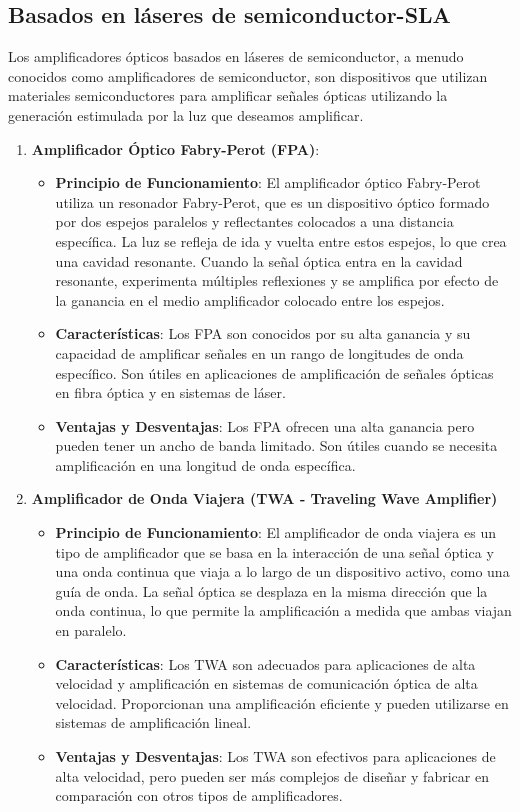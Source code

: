 \documentclass[
	12pt, %
	fleqn, %
	a4paper, %
	oneside, %
]{LegrandOrangeBook}
\begin{document}
\subsection{Basados en láseres de semiconductor-SLA}
Los amplificadores ópticos basados en láseres de semiconductor, a menudo conocidos como amplificadores de semiconductor, son dispositivos que utilizan materiales semiconductores para amplificar señales ópticas utilizando la generación estimulada por la luz que deseamos amplificar.
\begin{enumerate}
\item \textbf{Amplificador Óptico Fabry-Perot (FPA)}:
\begin{itemize}
\item \textbf{Principio de Funcionamiento}: El amplificador óptico Fabry-Perot utiliza un resonador Fabry-Perot, que es un dispositivo óptico formado por dos espejos paralelos y reflectantes colocados a una distancia específica. La luz se refleja de ida y vuelta entre estos espejos, lo que crea una cavidad resonante. Cuando la señal óptica entra en la cavidad resonante, experimenta múltiples reflexiones y se amplifica por efecto de la ganancia en el medio amplificador colocado entre los espejos.
\item \textbf{Características}: Los FPA son conocidos por su alta ganancia y su capacidad de amplificar señales en un rango de longitudes de onda específico. Son útiles en aplicaciones de amplificación de señales ópticas en fibra óptica y en sistemas de láser.
\item \textbf{Ventajas y Desventajas}: Los FPA ofrecen una alta ganancia pero pueden tener un ancho de banda limitado. Son útiles cuando se necesita amplificación en una longitud de onda específica.
\end{itemize}

\item \textbf{Amplificador de Onda Viajera (TWA - Traveling Wave Amplifier)}
\begin{itemize}
\item \textbf{Principio de Funcionamiento}: El amplificador de onda viajera es un tipo de amplificador que se basa en la interacción de una señal óptica y una onda continua que viaja a lo largo de un dispositivo activo, como una guía de onda. La señal óptica se desplaza en la misma dirección que la onda continua, lo que permite la amplificación a medida que ambas viajan en paralelo.
\item \textbf{Características}: Los TWA son adecuados para aplicaciones de alta velocidad y amplificación en sistemas de comunicación óptica de alta velocidad. Proporcionan una amplificación eficiente y pueden utilizarse en sistemas de amplificación lineal.
\item \textbf{Ventajas y Desventajas}: Los TWA son efectivos para aplicaciones de alta velocidad, pero pueden ser más complejos de diseñar y fabricar en comparación con otros tipos de amplificadores.
\end{itemize}


\end{enumerate}
\end{document}
